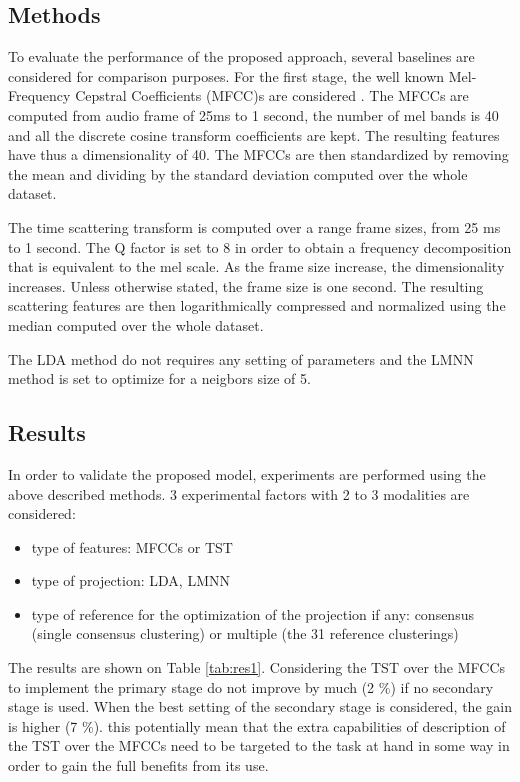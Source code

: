 \documentclass{article}
\begin{document}
\subsection{Methods}

To evaluate the performance of the proposed approach, several baselines are considered for comparison purposes. For the first stage, the well known Mel-Frequency Cepstral Coefficients (MFCC)s are considered \cite{rabiner1993fundamentals}. The MFCCs are computed from audio frame of 25ms to 1 second, the number of mel bands is 40 and all the discrete cosine transform coefficients are kept. The resulting features have thus a dimensionality of 40. The MFCCs are then standardized by removing the mean and dividing by the standard deviation computed over the whole dataset.

The time scattering transform is computed over a range frame sizes, from 25 ms to 1 second. The Q factor is set to 8 in order to obtain a frequency decomposition that is equivalent to the mel scale. As the frame size increase, the dimensionality increases. Unless otherwise stated, the frame size is one second. The resulting scattering features are then logarithmically compressed and normalized using the median computed over the whole dataset.

The LDA method do not requires any setting of parameters and the LMNN method is set to optimize for a neigbors size of 5.

\subsection{Results}

In order to validate the proposed model, experiments are performed using the above described methods. 3 experimental factors with 2 to 3 modalities are considered:
\begin{itemize}
  \item type of features: MFCCs or TST
  \item type of projection: LDA, LMNN
  \item type of reference for the optimization of the projection if any: consensus (single consensus clustering) or multiple (the 31 reference clusterings)
\end{itemize}
The results are shown on Table \ref{tab:res1}. Considering the TST over the MFCCs to implement the primary stage do not improve by much (2 \%) if no secondary stage is used. When the best setting of the secondary stage is considered, the gain is higher (7 \%). this potentially mean that the extra capabilities of description of the TST over the MFCCs need to be targeted to the task at hand in some way in order to gain the full benefits from its use.
\end{document}
